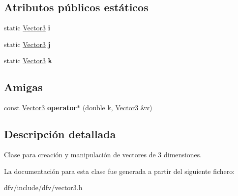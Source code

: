 \subsection*{\-Atributos públicos estáticos}
\begin{DoxyCompactItemize}
\item 
\hypertarget{classdfv_1_1Vector3_ac51f63b3e445bdb4b699da68afb6caad}{static \hyperlink{classdfv_1_1Vector3}{\-Vector3} {\bfseries i}}\label{classdfv_1_1Vector3_ac51f63b3e445bdb4b699da68afb6caad}

\item 
\hypertarget{classdfv_1_1Vector3_a51f47e92a52201d2cba861ca78c78fed}{static \hyperlink{classdfv_1_1Vector3}{\-Vector3} {\bfseries j}}\label{classdfv_1_1Vector3_a51f47e92a52201d2cba861ca78c78fed}

\item 
\hypertarget{classdfv_1_1Vector3_a904de6da877521470690a82fcc73af15}{static \hyperlink{classdfv_1_1Vector3}{\-Vector3} {\bfseries k}}\label{classdfv_1_1Vector3_a904de6da877521470690a82fcc73af15}

\end{DoxyCompactItemize}
\subsection*{\-Amigas}
\begin{DoxyCompactItemize}
\item 
\hypertarget{classdfv_1_1Vector3_ac4a9c89fcbebb3ee954405adf28782d7}{const \hyperlink{classdfv_1_1Vector3}{\-Vector3} {\bfseries operator$\ast$} (double k, \hyperlink{classdfv_1_1Vector3}{\-Vector3} \&v)}\label{classdfv_1_1Vector3_ac4a9c89fcbebb3ee954405adf28782d7}

\end{DoxyCompactItemize}


\subsection{\-Descripción detallada}
\-Clase para creación y manipulación de vectores de 3 dimensiones. 

\-La documentación para esta clase fue generada a partir del siguiente fichero\-:\begin{DoxyCompactItemize}
\item 
dfv/include/dfv/vector3.\-h\end{DoxyCompactItemize}
